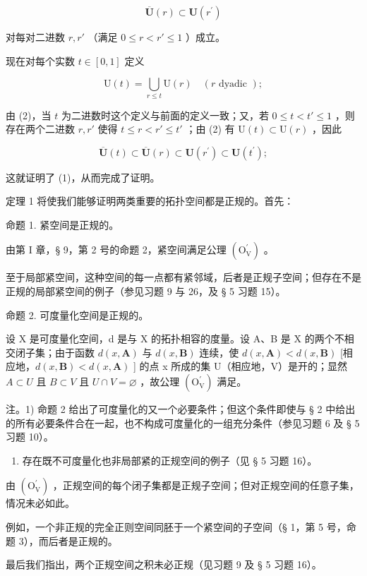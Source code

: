 \[
\overline {{{\mathbf {U}}}} (r) \subset \mathbf {U} (r ^ {\prime})\tag{2}
\]

对每对二进数 \(r, r'\) （满足 \(0 \leqslant r < r' \leqslant 1\) ）成立。

现在对每个实数 \(t \in [0, 1]\) 定义

\[
\mathrm{U} (t) = \bigcup_ {r \leqslant t} \mathrm{U} (r) \quad (r \text { dyadic });
\]

由 (2)，当 \(t\) 为二进数时这个定义与前面的定义一致；又，若 \(0 \leqslant t < t' \leqslant 1\) ，则存在两个二进数 \(r, r'\) 使得 \(t \leqslant r < r' \leqslant t'\) ；由 (2) 有 \(\mathrm{U}(t) \subset \mathrm{U}(r)\) ，因此

\[
\overline {{{\mathbf {U}}}} (t) \subset \overline {{{\mathbf {U}}}} (r) \subset \mathbf {U} (r ^ {\prime}) \subset \mathbf {U} (t ^ {\prime});
\]

这就证明了 (1)，从而完成了证明。

定理 1 将使我们能够证明两类重要的拓扑空间都是正规的。首先：

命题 1. 紧空间是正规的。

由第 I 章，§ 9，第 2 号的命题 2，紧空间满足公理 \((\mathrm{O}_{\mathrm{V}}^{\prime})\) 。

至于局部紧空间，这种空间的每一点都有紧邻域，后者是正规子空间；但存在不是正规的局部紧空间的例子（参见习题 9 与 26，及 § 5 习题 15）。

命题 2. 可度量化空间是正规的。

设 X 是可度量化空间，d 是与 X 的拓扑相容的度量。设 A、B 是 X 的两个不相交闭子集；由于函数 \(d(x, \mathbf{A})\) 与 \(d(x, \mathbf{B})\) 连续，使 \(d(x, \mathbf{A}) < d(x, \mathbf{B})\) {[}相应地，\(d(x, \mathbf{B}) < d(x, \mathbf{A})\) {]} 的点 x 所成的集 U（相应地，V）是开的；显然 \(A \subset U\) 且 \(B \subset V\) 且 \(U \cap V = \varnothing\) ，故公理 \((\mathrm{O}_{\mathrm{V}}^{\prime})\) 满足。

注。1) 命题 2 给出了可度量化的又一个必要条件；但这个条件即使与 § 2 中给出的所有必要条件合在一起，也不构成可度量化的一组充分条件（参见习题 6 及 § 5 习题 10）。

\begin{enumerate}
\def\labelenumi{\arabic{enumi})}
\setcounter{enumi}{1}
\tightlist
\item
  存在既不可度量化也非局部紧的正规空间的例子（见 § 5 习题 16）。
\end{enumerate}

由 \((\mathrm{O}_{\mathrm{V}}^{\prime})\) ，正规空间的每个闭子集都是正规子空间；但对正规空间的任意子集，情况未必如此。

例如，一个非正规的完全正则空间同胚于一个紧空间的子空间（§ 1，第 5 号，命题 3），而后者是正规的。

最后我们指出，两个正规空间之积未必正规（见习题 9 及 § 5 习题 16）。

